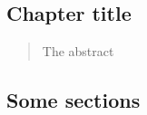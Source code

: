
\begin{bibunit}[plain]
\ifdefined\thechapter
   \setcounter{chapter}{0}
   \chapter{Chapter title}
\else
   \maketitle
\fi

   
   
\begin{abstract}
   The abstract
\end{abstract}
\section{Some sections}
\cite{Vandalon2016}

\putbib[library]
\end{bibunit}
